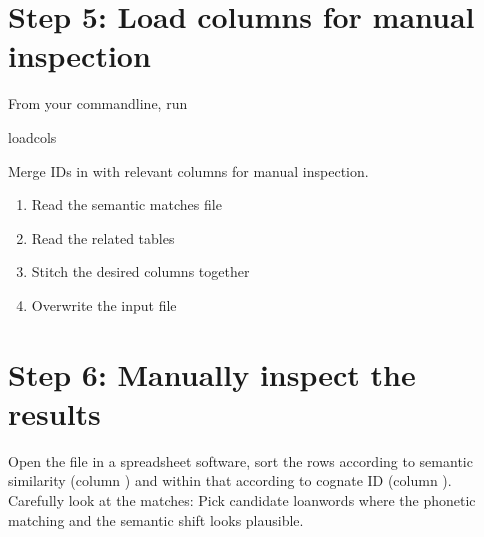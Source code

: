 \documentclass[letterpaper,10pt,english]{sphinxmanual}
\begin{document}
\section{Step 5: Load columns for manual inspection}
\label{\detokenize{workflow:step-5-load-columns-for-manual-inspection}}
\sphinxAtStartPar
From your command\sphinxhyphen{}line, run

\begin{sphinxVerbatim}[commandchars=\\\{\}]
loadcols
\end{sphinxVerbatim}
\label{\detokenize{workflow:module-gothuncommands.loadcols}}
\sphinxAtStartPar
Merge IDs in  with relevant columns for manual
inspection.

\begin{fulllineitems}
\label{\detokenize{workflow:gothuncommands.loadcols.main}}
\pysigstartsignatures
{}
\pysigstopsignatures\begin{enumerate}
%
\item {} 
\sphinxAtStartPar
Read the semantic matches file

\item {} 
\sphinxAtStartPar
Read the related tables

\item {} 
\sphinxAtStartPar
Stitch the desired columns together

\item {} 
\sphinxAtStartPar
Overwrite the input file

\end{enumerate}

\end{fulllineitems}



\section{Step 6: Manually inspect the results}
\label{\detokenize{workflow:step-6-manually-inspect-the-results}}
\sphinxAtStartPar
Open the file in a spread\sphinxhyphen{}sheet software, sort the rows according to
semantic similarity (column ) and within that according to
cognate ID (column ). Carefully look at the matches:
Pick candidate loanwords where the phonetic matching and the semantic shift
looks plausible.
\end{document}
